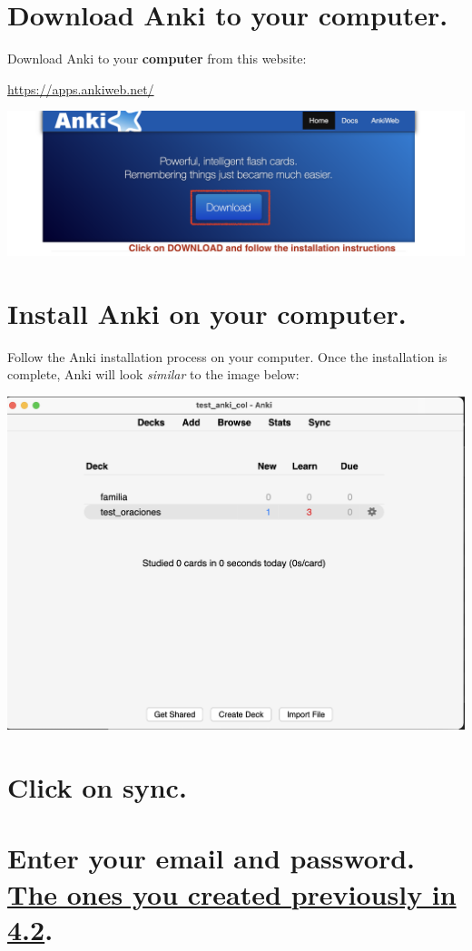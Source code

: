 \documentclass[
]{book}
\begin{document}
\hypertarget{download-anki-to-your-computer.}{%
\section{Download Anki to your computer.}\label{download-anki-to-your-computer.}}

Download Anki to your \textbf{computer} from this website:

\url{https://apps.ankiweb.net/}

\includegraphics[width=0.6\linewidth]{images/reposit_en/download}

\hypertarget{install-anki-on-your-computer.}{%
\section{Install Anki on your computer.}\label{install-anki-on-your-computer.}}

Follow the Anki installation process on your computer. Once the installation is complete, Anki will look \emph{similar} to the image below:

\includegraphics[width=0.6\linewidth]{images/reposit_en/anki_screen}

\hypertarget{click-on-sync.}{%
\section{Click on sync.}\label{click-on-sync.}}

\hypertarget{enter-your-email-and-password.-the-ones-you-created-previously-in-4.2.}{%
\section{\texorpdfstring{Enter your email and password. \protect\hyperlink{cross_3}{The ones you created previously in 4.2}.}{Enter your email and password. The ones you created previously in 4.2.}}\label{enter-your-email-and-password.-the-ones-you-created-previously-in-4.2.}}
\end{document}
